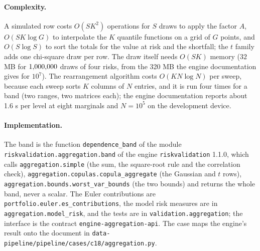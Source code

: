 \paragraph{Complexity.}
A simulated row costs $O(SK^{2})$ operations for $S$ draws to apply the factor $A$, $O(SK\log G)$ to interpolate the $K$
quantile functions on a grid of $G$ points, and $O(S\log S)$ to sort the totals for the value at risk and the shortfall; the
$t$ family adds one chi-square draw per row. The draw itself needs $O(SK)$ memory ($32$ MB for $1{,}000{,}000$ draws of four
risks, from the 320 MB the engine documentation gives for $10^{7}$). The rearrangement algorithm costs $O(KN\log N)$ per sweep,
because each sweep sorts $K$ columns of $N$ entries, and it is run four times for a band (two ranges, two matrices each); the
engine documentation reports about 1.6 s per level at eight marginals and $N=10^{5}$ on the development device.

\paragraph{Implementation.}
The band is the function \texttt{dependence\_band} of the module \texttt{riskvalidation.\allowbreak aggregation.\allowbreak band} of the engine
\texttt{riskvalidation} 1.1.0, which calls \texttt{aggregation.simple} (the sum, the square-root rule and the correlation check),
\texttt{aggregation.\allowbreak copulas.\allowbreak copula\_\allowbreak aggregate} (the Gaussian and $t$ rows), \texttt{aggregation.\allowbreak bounds.\allowbreak worst\_\allowbreak var\_\allowbreak bounds} (the
two bounds) and returns the whole band, never a scalar. The Euler contributions are \texttt{portfolio.\allowbreak euler.\allowbreak es\_\allowbreak contributions},
the model risk measures are in \texttt{aggregation.model\_risk}, and the tests are in \texttt{validation.aggregation}; the
interface is the contract \texttt{engine-aggregation-api}. The case maps the engine's result onto the document in
\texttt{data-pipeline/pipeline/cases/c18/aggregation.\allowbreak py}.

